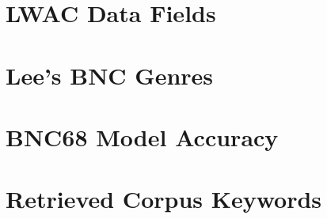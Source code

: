 

\section{LWAC Data Fields}
\label{sec:appx:fields}



\pagebreak
\section{Lee's BNC Genres}
\label{sec:appx:sample}


\pagebreak
\section{BNC68 Model Accuracy}
\label{sec:appx:bayesianbnc68}


\pagebreak
\section{Retrieved Corpus Keywords}
\label{sec:appx:keywords}





